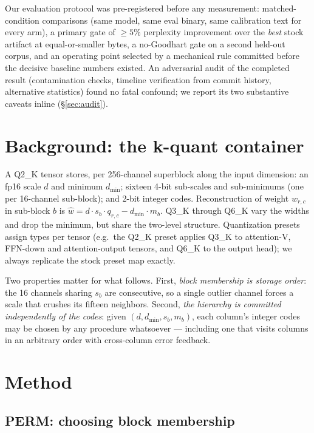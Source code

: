 \documentclass[11pt]{article}
\begin{document}
Our evaluation protocol was pre-registered before any measurement: matched-condition
comparisons (same model, same eval binary, same calibration text for every arm), a
primary gate of $\geq 5\%$ perplexity improvement over the \emph{best} stock artifact
at equal-or-smaller bytes, a no-Goodhart gate on a second held-out corpus, and an
operating point selected by a mechanical rule committed before the decisive baseline
numbers existed. An adversarial audit of the completed result (contamination checks,
timeline verification from commit history, alternative statistics) found no fatal
confound; we report its two substantive caveats inline (\S\ref{sec:audit}).

\section{Background: the k-quant container}
\label{sec:background}

A Q2\_K tensor stores, per 256-channel superblock along the input dimension: an fp16
scale $d$ and minimum $d_{\min}$; sixteen 4-bit sub-scales and sub-minimums (one per
16-channel sub-block); and 2-bit integer codes. Reconstruction of weight $w_{r,c}$ in
sub-block $b$ is $\hat w = d \cdot s_b \cdot q_{r,c} - d_{\min} \cdot m_b$. Q3\_K
through Q6\_K vary the widths and drop the minimum, but share the two-level structure.
Quantization presets assign types per tensor (e.g.\ the Q2\_K preset applies Q3\_K to
attention-V, FFN-down and attention-output tensors, and Q6\_K to the output head);
we always replicate the stock preset map exactly.

Two properties matter for what follows. First, \emph{block membership is storage
order}: the 16 channels sharing $s_b$ are consecutive, so a single outlier channel
forces a scale that crushes its fifteen neighbors. Second, \emph{the hierarchy is
committed independently of the codes}: given $(d, d_{\min}, s_b, m_b)$, each column's
integer codes may be chosen by any procedure whatsoever --- including one that visits
columns in an arbitrary order with cross-column error feedback.

\section{Method}

\subsection{PERM: choosing block membership}
\label{sec:perm}
\end{document}
